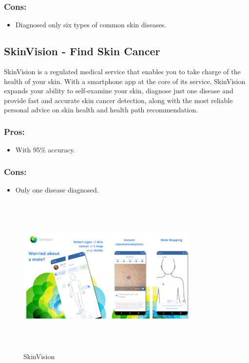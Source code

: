 \subsubsection{Cons:}
\begin{itemize}
     \item Diagnosed only six types of common skin diseases.\\
\end{itemize}

\subsection{SkinVision -  Find Skin Cancer }
SkinVision is a regulated medical service that enables you to take charge of the health of your skin.
With a smartphone app at the core of its service, SkinVision expands your ability to self-examine your skin, diagnose just one disease and provide fast and accurate skin cancer detection, along with the most reliable personal advice on skin health and health path recommendation.
 \subsubsection{Pros:}
 \begin{itemize}
     \item With 95\% accuracy.\\
 \end{itemize}
\subsubsection{Cons:}
\begin{itemize}
     \item Only one disease diagnosed.\\
\end{itemize}
\begin{figure}[H]
 \centering 
 \includegraphics[height= 8cm, width=9cm]{backmatter/figures/SkinVision.PNG}
 \caption{SkinVision}
 \end{figure}
 
